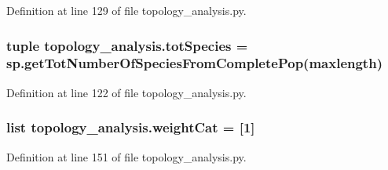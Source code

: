 Definition at line 129 of file topology\+\_\+analysis.\+py.

\hypertarget{a00159_ac657414359bc072005d43b2328119a7d}{
\subsubsection[{tot\+Species}]{\setlength{\rightskip}{0pt plus 5cm}tuple topology\+\_\+analysis.\+tot\+Species = sp.\+get\+Tot\+Number\+Of\+Species\+From\+Complete\+Pop(maxlength)}}\label{a00159_ac657414359bc072005d43b2328119a7d}


Definition at line 122 of file topology\+\_\+analysis.\+py.

\hypertarget{a00159_a67cf979bfd8cf26867524a1a788a5e63}{
\subsubsection[{weight\+Cat}]{\setlength{\rightskip}{0pt plus 5cm}list topology\+\_\+analysis.\+weight\+Cat = \mbox{[}1\mbox{]}}}\label{a00159_a67cf979bfd8cf26867524a1a788a5e63}


Definition at line 151 of file topology\+\_\+analysis.\+py.

